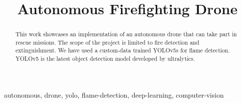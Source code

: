\documentclass[conference]{IEEEtran}
\begin{document}
\title{Autonomous Firefighting Drone}

\author{
}

\maketitle

\begin{abstract}
This work showcases an implementation of an autonomous drone that can take part in rescue missions. The scope of the project is limited to fire detection and extinguishment. We have used a custom-data trained YOLOv5s for flame detection. YOLOv5 is the latest object detection model developed by ultralytics. %
\end{abstract}

\begin{IEEEkeywords}
autonomous, drone, yolo, flame-detection, deep-learning, computer-vision
\end{IEEEkeywords}
\end{document}
